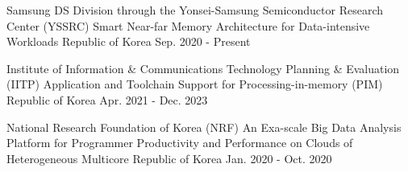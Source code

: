 

\begin{cventries}

  \cventry
    {Samsung DS Division through the Yonsei-Samsung Semiconductor Research Center (YSSRC)} %
    {Smart Near-far Memory Architecture for Data-intensive Workloads} %
    {Republic of Korea} %
    {Sep. 2020 - Present} %
    {
      \begin{cvitems} %
      \end{cvitems}
    }

  \cventry
    {Institute of Information \& Communications Technology Planning \& Evaluation (IITP)} %
    {Application and Toolchain Support for Processing-in-memory (PIM)} %
    {Republic of Korea} %
    {Apr. 2021 - Dec. 2023} %
    {
      \begin{cvitems} %
      \end{cvitems}
    }

  \cventry
    {National Research Foundation of Korea (NRF)} %
    {An Exa-scale Big Data Analysis Platform for Programmer Productivity and Performance on Clouds of Heterogeneous Multicore} %
    {Republic of Korea} %
    {Jan. 2020 - Oct. 2020} %
    {
      \begin{cvitems} %
      \end{cvitems}
    }

\end{cventries}

